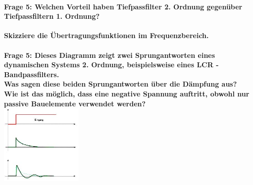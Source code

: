 \documentclass[11pt,a4paper]{scrartcl}
\begin{document}
\\
\textbf{Frage 5: Welchen Vorteil haben Tiefpassfilter 2. Ordnung gegenüber Tiefpassfiltern 1. Ordnung?}\\
\\
\textbf{Skizziere die Übertragungsfunktionen im Frequenzbereich.}\\
\\
\textbf{Frage 5: Dieses Diagramm zeigt zwei Sprungantworten eines dynamischen Systems 2. Ordnung, beispielsweise eines LCR - Bandpassfilters.\\
Was sagen diese beiden Sprungantworten über die Dämpfung aus? \\
Wie ist das möglich, dass eine negative Spannung auftritt, obwohl nur passive Bauelemente verwendet werden?}\\
\includegraphics[width=4cm,keepaspectratio]{sprungantwort.jpg}\\
\\
\end{document}
